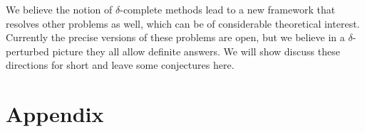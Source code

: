 \documentclass[envcountsect]{llncs}
\begin{document}
We believe the notion of $\delta$-complete methods lead to a new framework that
resolves other problems as well, which can be of considerable theoretical
interest. Currently the precise versions of these problems are open, but we
believe in a $\delta$-perturbed picture they all allow definite answers. We
will show discuss these directions for short and leave some conjectures here.








\newpage
\section*{Appendix}
\end{document}
